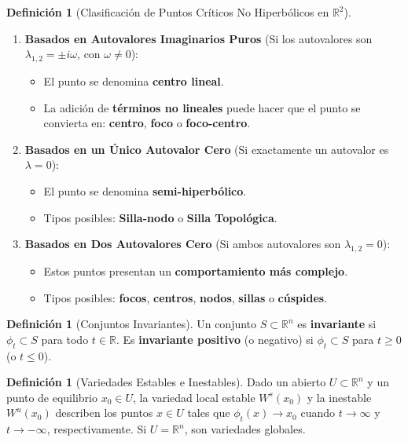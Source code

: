\documentclass[12pt,letterpaper,oneside]{book}
\theoremstyle{definition}
\newtheorem{definicion}[teorema]{Definición}
\theoremstyle{remark}
\begin{document}
	\begin{definicion}[Clasificación de Puntos Críticos No Hiperbólicos en $\mathbb{R}^2$] \
		\begin{enumerate}
			\item \textbf{Basados en Autovalores Imaginarios Puros} (Si los autovalores son $\lambda_{1,2} = \pm i\omega$, con $\omega \neq 0$):
			\begin{itemize}
				\item El punto se denomina \textbf{centro lineal}.
				\item La adición de \textbf{términos no lineales} puede hacer que el punto se convierta en: \textbf{centro}, \textbf{foco} o \textbf{foco-centro}.
			\end{itemize}
			
			\item \textbf{Basados en un Único Autovalor Cero} (Si exactamente un autovalor es $\lambda = 0$):
			\begin{itemize}
				\item El punto se denomina \textbf{semi-hiperbólico}.
				\item Tipos posibles: \textbf{Silla-nodo} o \textbf{Silla Topológica}.
			\end{itemize}
			
			\item \textbf{Basados en Dos Autovalores Cero} (Si ambos autovalores son $\lambda_{1,2} = 0$):
			\begin{itemize}
				\item Estos puntos presentan un \textbf{comportamiento más complejo}.
				\item Tipos posibles: \textbf{focos}, \textbf{centros}, \textbf{nodos}, \textbf{sillas} o \textbf{cúspides}.
			\end{itemize}
		\end{enumerate}
	\end{definicion}
	
	\begin{definicion}[Conjuntos Invariantes]
		Un conjunto $S \subset \mathbb{R}^n$ es \textbf{invariante} si $\phi_t \subset S$ para todo $t \in \mathbb{R}$. Es \textbf{invariante positivo} (o negativo) si $\phi_t \subset S$ para $t \geq 0$ (o $t \leq 0$).
	\end{definicion}
	
	\begin{definicion}[Variedades Estables e Inestables]
		Dado un abierto $U \subset \mathbb{R}^n$ y un punto de equilibrio $x_0 \in U$, la variedad local estable $W^s(x_0)$ y la inestable $W^u(x_0)$ describen los puntos $x \in U$ tales que $\phi_t(x) \rightarrow x_0$ cuando $t \to \infty$ y $t \to -\infty$, respectivamente. Si $U = \mathbb{R}^n$, son variedades globales.
	\end{definicion}
	
\end{document}
